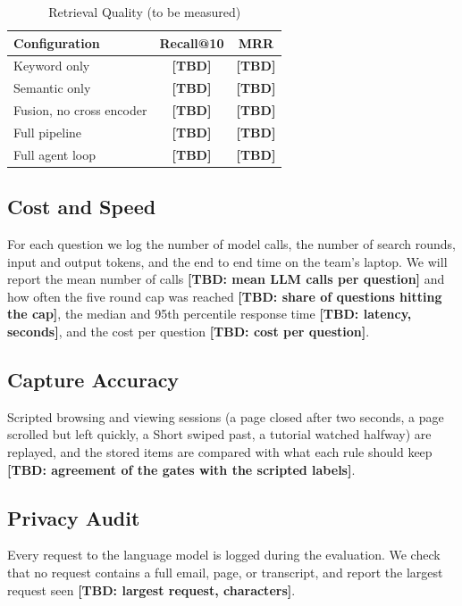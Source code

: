 \documentclass[conference]{IEEEtran}
\newcommand{\tbd}[1]{\textbf{[TBD: #1]}}
\begin{document}
\begin{table}[t]
\caption{Retrieval Quality (to be measured)}
\label{tab:results}
\centering
\renewcommand{\arraystretch}{1.15}
\begin{tabular}{|l|c|c|}
\hline
\textbf{Configuration} & \textbf{Recall@10} & \textbf{MRR} \\
\hline
Keyword only & \textbf{[TBD]} & \textbf{[TBD]} \\
\hline
Semantic only & \textbf{[TBD]} & \textbf{[TBD]} \\
\hline
Fusion, no cross encoder & \textbf{[TBD]} & \textbf{[TBD]} \\
\hline
Full pipeline & \textbf{[TBD]} & \textbf{[TBD]} \\
\hline
Full agent loop & \textbf{[TBD]} & \textbf{[TBD]} \\
\hline
\end{tabular}
\end{table}

\subsection{Cost and Speed}
For each question we log the number of model calls, the number of search rounds, input and output tokens, and the end to end time on the team's laptop. We will report the mean number of calls \tbd{mean LLM calls per question} and how often the five round cap was reached \tbd{share of questions hitting the cap}, the median and 95th percentile response time \tbd{latency, seconds}, and the cost per question \tbd{cost per question}.

\subsection{Capture Accuracy}
Scripted browsing and viewing sessions (a page closed after two seconds, a page scrolled but left quickly, a Short swiped past, a tutorial watched halfway) are replayed, and the stored items are compared with what each rule should keep \tbd{agreement of the gates with the scripted labels}.

\subsection{Privacy Audit}
Every request to the language model is logged during the evaluation. We check that no request contains a full email, page, or transcript, and report the largest request seen \tbd{largest request, characters}.
\end{document}
